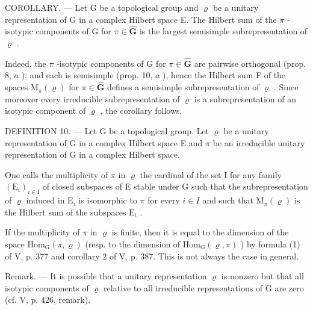 COROLLARY. --- Let G be a topological group and \(\varrho\) be a unitary representation of G in a complex Hilbert space E. The Hilbert sum of the \(\pi\) -isotypic components of G for \(\pi \in \widehat{\mathbf{G}}\) is the largest semisimple subrepresentation of \(\varrho\) .

Indeed, the \(\pi\) -isotypic components of G for \(\pi \in \widehat{\mathbf{G}}\) are pairwise orthogonal (prop. 8, \(a\) ), and each is semisimple (prop. 10, \(a\) ), hence the Hilbert sum F of the spaces \(\mathrm{M}_{\pi}(\varrho)\) for \(\pi \in \widehat{\mathbf{G}}\) defines a semisimple subrepresentation of \(\varrho\) . Since moreover every irreducible subrepresentation of \(\varrho\) is a subrepresentation of an isotypic component of \(\varrho\) , the corollary follows.

DEFINITION 10. --- Let G be a topological group. Let \(\varrho\) be a unitary representation of G in a complex Hilbert space E and \(\pi\) be an irreducible unitary representation of G in a complex Hilbert space.

One calls the multiplicity of \(\pi\) in \(\varrho\) the cardinal of the set I for any family \((\mathrm{E}_i)_{i\in \mathrm{I}}\) of closed subspaces of E stable under G such that the subrepresentation of \(\varrho\) induced in \(\mathrm{E}_i\) is isomorphic to \(\pi\) for every \(i\in I\) and such that \(\mathrm{M}_{\pi}(\varrho)\) is the Hilbert sum of the subspaces \(\mathrm{E}_i\) .

If the multiplicity of \(\pi\) in \(\varrho\) is finite, then it is equal to the dimension of the space \(\mathrm{Hom}_{\mathrm{G}}(\pi, \varrho)\) (resp. to the dimension of \(\mathrm{Hom}_{\mathrm{G}}(\varrho, \pi)\) ) by formula (1) of V, p. 377 and corollary 2 of V, p. 387. This is not always the case in general.

Remark. --- It is possible that a unitary representation \(\varrho\) is nonzero but that all isotypic components of \(\varrho\) relative to all irreducible representations of G are zero (cf. V, p. 426, remark).

